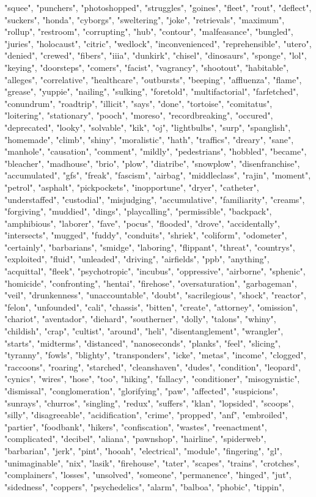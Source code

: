 "squee", "punchers", "photoshopped", "struggles", "goines", "fleet", "rout", "deflect", "suckers", "honda", "cyborgs", "sweltering", "joke", "retrievals", "maximum", "rollup", "restroom", "corrupting", "hub", "contour", "malfeasance", "bungled", "juries", "holocaust", "citric", "wedlock", "inconvenienced", "reprehensible", "utero", "denied", "crewed", "fibers", "iiia", "dunkirk", "chisel", "dinosaurs", "sponge", "lol", "keying", "doorsteps", "comers", "facist", "vagrancy", "shootout", "habitable", "alleges", "correlative", "healthcare", "outbursts", "beeping", "affluenza", "flame", "grease", "yuppie", "nailing", "sulking", "foretold", "multifactorial", "farfetched", "conundrum", "roadtrip", "illicit", "says", "done", "tortoise", "comitatus", "loitering", "stationary", "pooch", "moreso", "recordbreaking", "occured", "deprecated", "looky", "solvable", "kik", "oj", "lightbulbs", "surp", "spanglish", "homemade", "climb", "shiny", "moralistic", "hath", "traffics", "dreary", "sane", "manhole", "causation", "comment", "mildly", "pedestrians", "hobbled", "became", "bleacher", "madhouse", "brio", "plow", "diatribe", "snowplow", "disenfranchise", "accumulated", "gfs", "freak", "fascism", "airbag", "middleclass", "rajin", "moment", "petrol", "asphalt", "pickpockets", "inopportune", "dryer", "catheter", "understaffed", "custodial", "misjudging", "accumulative", "familiarity", "creams", "forgiving", "muddied", "dings", "playcalling", "permissible", "backpack", "amphibious", "laborer", "fave", "pocus", "flooded", "drove", "accidentally", "intersects", "mugged", "fuddy", "conduits", "shriek", "coliform", "odometer", "certainly", "barbarians", "smidge", "laboring", "flippant", "threat", "countrys", "exploited", "fluid", "unleaded", "driving", "airfields", "ppb", "anything", "acquittal", "fleek", "psychotropic", "incubus", "oppressive", "airborne", "sphenic", "homicide", "confronting", "hentai", "firehose", "oversaturation", "garbageman", "veil", "drunkenness", "unaccountable", "doubt", "sacrilegious", "shock", "reactor", "felon", "unfounded", "cali", "chassis", "bitten", "create", "attorney", "omission", "chariot", "aventador", "diehard", "southerner", "dolly", "talons", "whiny", "childish", "crap", "cultist", "around", "heli", "disentanglement", "wrangler", "starts", "midterms", "distanced", "nanoseconds", "planks", "feel", "slicing", "tyranny", "fowls", "blighty", "transponders", "icke", "metas", "income", "clogged", "raccoons", "roaring", "starched", "cleanshaven", "dudes", "condition", "leopard", "cynics", "wires", "hose", "too", "hiking", "fallacy", "conditioner", "misogynistic", "dismissal", "conglomeration", "glorifying", "paw", "affected", "suspicions", "sunrays", "churros", "singling", "redux", "suffers", "klan", "lopsided", "scoops", "silly", "disagreeable", "acidification", "crime", "propped", "anf", "embroiled", "partier", "foodbank", "hikers", "confiscation", "wastes", "reenactment", "complicated", "decibel", "aliana", "pawnshop", "hairline", "spiderweb", "barbarian", "jerk", "pint", "hooah", "electrical", "module", "fingering", "gl", "unimaginable", "nix", "lasik", "firehouse", "tater", "scapes", "trains", "crotches", "complainers", "losses", "unsolved", "someone", "permanence", "hinged", "jut", "sidedness", "coppers", "psychedelics", "alarm", "balboa", "phobic", "tippin", 